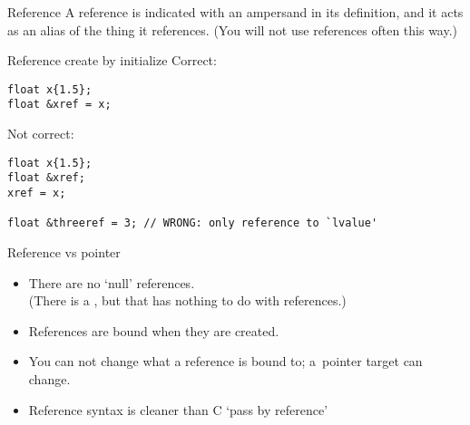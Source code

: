 \begin{block}{Reference}
  \label{sl:cpp-reference}
  A reference is indicated with an ampersand in its definition, and it
  acts as an alias of the thing it references.
  (You will not use references often this way.)
\end{block}

\begin{block}{Reference create by initialize}
  \label{sl:cpp-ref-define}
  Correct:
\begin{lstlisting}
float x{1.5};
float &xref = x;
\end{lstlisting}
Not correct:
\begin{lstlisting}
float x{1.5};
float &xref;
xref = x;

float &threeref = 3; // WRONG: only reference to `lvalue'
\end{lstlisting}
\end{block}

\begin{comment}
  \begin{advanced}
    If you already know about pointers, you may wonder about the similarities.
    \begin{itemize}
    \item There are no `null' references. There is a \indexc{nullptr}.
    \item References are bound when they are created.
    \item You can not change what a reference is bound to;
      the pointer target can change.
    \item Reference syntax is cleaner.
    \item Pointer use has implications about ownership: use only for specific purposes.
    \end{itemize}
  \end{advanced}
\end{comment}

\begin{slide}{Reference vs pointer}
  \label{sl:ref-vs-ptr}
  \begin{itemize}
  \item There are no `null' references.\\
    (There is a , but that has nothing to do with references.)
  \item References are bound when they are created.
  \item You can not change what a reference is bound to;
    a~pointer target can change.
  \item Reference syntax is cleaner than C `pass by reference'
  \end{itemize}
\end{slide}

